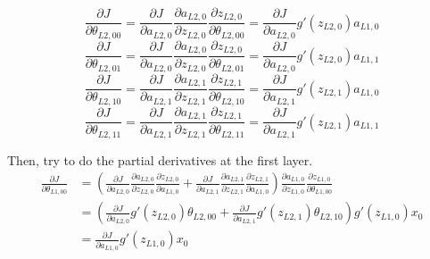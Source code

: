 \begin{itemize}
    \begin{equation}
        \frac{\partial J}{\partial \theta_{L2,00}} = \frac{\partial J}{\partial a_{L2,0}}\frac{\partial a_{L2,0}}{\partial z_{L2,0}}\frac{\partial z_{L2,0}}{\partial \theta_{L2,00}} = \frac{\partial J}{\partial a_{L2,0}} g'(z_{L2,0}) a_{L1,0}
    \end{equation}
    \begin{equation}
        \frac{\partial J}{\partial \theta_{L2,01}} = \frac{\partial J}{\partial a_{L2,0}}\frac{\partial a_{L2,0}}{\partial z_{L2,0}}\frac{\partial z_{L2,0}}{\partial \theta_{L2,01}} = \frac{\partial J}{\partial a_{L2,0}} g'(z_{L2,0}) a_{L1,1}
    \end{equation}
    \begin{equation}
        \frac{\partial J}{\partial \theta_{L2,10}} = \frac{\partial J}{\partial a_{L2,1}}\frac{\partial a_{L2,1}}{\partial z_{L2,1}}\frac{\partial z_{L2,1}}{\partial \theta_{L2,10}} = \frac{\partial J}{\partial a_{L2,1}} g'(z_{L2,1}) a_{L1,0}
    \end{equation}
    \begin{equation}
        \frac{\partial J}{\partial \theta_{L2,11}} = \frac{\partial J}{\partial a_{L2,1}}\frac{\partial a_{L2,1}}{\partial z_{L2,1}}\frac{\partial z_{L2,1}}{\partial \theta_{L2,11}} = \frac{\partial J}{\partial a_{L2,1}} g'(z_{L2,1}) a_{L1,1}
    \end{equation}
    
    Then, try to do the partial derivatives at the first layer.
    \begin{equation}\label{eqn:partialDerivative}
        \begin{aligned}
            \frac{\partial J}{\partial \theta_{L1,00}} &= \left({ \frac{\partial J}{\partial a_{L2,0}}\frac{\partial a_{L2,0}}{\partial z_{L2,0}}\frac{\partial z_{L2,0}}{\partial a_{L1,0}} + \frac{\partial J}{\partial a_{L2,1}}\frac{\partial a_{L2,1}}{\partial z_{L2,1}}\frac{\partial z_{L2,1}}{\partial a_{L1,0}} }\right) \frac{\partial a_{L1,0}}{\partial z_{L1,0}}\frac{\partial z_{L1,0}}{\partial \theta_{L1,00}}\\
                                                        &= \left({ \frac{\partial J}{\partial a_{L2,0}} g'(z_{L2,0}) \theta_{L2,00} + \frac{\partial J}{\partial a_{L2,1}} g'(z_{L2,1}) \theta_{L2,10}} \right) g'(z_{L1,0}) x_0 \\
                                                        &= \frac{\partial J}{\partial a_{L1,0}} g'(z_{L1,0}) x_0 \\
        \end{aligned}
    \end{equation}
    

\end{itemize}
